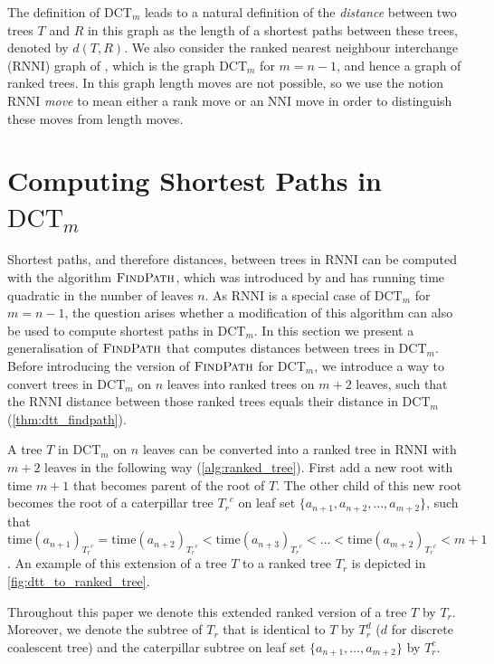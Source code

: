 \documentclass[11pt]{amsart}
\newcommand{\rnni}{\mathrm{RNNI}}
\newcommand{\findpath}{\textsc{FindPath}}
\newcommand{\ntime}{\mathrm{time}}
\newcommand{\nni}{\mathrm{NNI}}
\newcommand{\dtt}{\mathrm{DCT}}
\newcommand{\summary}[1]{} %
\begin{document}
The definition of $\dtt_m$ leads to a natural definition of the \emph{distance} between two trees $T$ and $R$ in this graph as the length of a shortest paths between these trees, denoted by $d(T,R)$.
We also consider the ranked nearest neighbour interchange ($\rnni$) graph of \textcite{Collienne2020-iu}, which is the graph $\dtt_m$ for $m=n-1$, and hence a graph of ranked trees.
In this graph length moves are not possible, so we use the notion $\rnni$ \emph{move} to mean either a rank move or an $\nni$ move in order to distinguish these moves from length moves.


\section{Computing Shortest Paths in $\dtt_m$}
\label{section:fp_dtt}

\summary{Introduce how we can use $\findpath$ to compute $\dtt_m$ distances}
Shortest paths, and therefore distances, between trees in $\rnni$ can be computed with the algorithm $\findpath$, which was introduced by \textcite{Collienne2020-iu} and has running time quadratic in the number of leaves $n$.
As $\rnni$ is a special case of $\dtt_m$ for $m = n-1$, the question arises whether a modification of this algorithm can also be used to compute shortest paths in $\dtt_m$.
In this section we present a generalisation of $\findpath$ that computes distances between trees in $\dtt_m$.
Before introducing the version of $\findpath$ for $\dtt_m$, we introduce a way to convert trees in $\dtt_m$ on $n$ leaves into ranked trees on $m+2$ leaves, such that the $\rnni$ distance between those ranked trees equals their distance in $\dtt_m$ (\autoref{thm:dtt_findpath}).

\summary{How to add leaves to a $\dtt_m$ tree to transform it into a ranked tree}
A tree $T$ in $\dtt_m$ on $n$ leaves can be converted into a ranked tree in $\rnni$ with $m+2$ leaves in the following way (\autoref{alg:ranked_tree}).
First add a new root with time $m + 1$ that becomes parent of the root of $T$.
The other child of this new root becomes the root of a caterpillar tree ${T_r}^c$ on leaf set $\{a_{n+1}, a_{n+2}, \ldots, a_{m+2}\}$, such that $\ntime(a_{n+1})_{{T_r}^c} = \ntime(a_{n+2})_{{T_r}^c} < \ntime(a_{n+3})_{{T_r}^c} < \ldots < \ntime(a_{m+2})_{{T_r}^c} < m+1$.
An example of this extension of a tree $T$ to a ranked tree $T_r$ is depicted in \autoref{fig:dtt_to_ranked_tree}.

Throughout this paper we denote this extended ranked version of a tree $T$ by $T_r$.
Moreover, we denote the subtree of $T_r$ that is identical to $T$ by $T_r^d$ ($d$ for discrete coalescent tree) and the caterpillar subtree on leaf set $\{a_{n+1}, \ldots, a_{m+2}\}$ by $T_r^c$.
\end{document}
